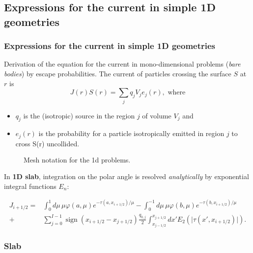 \documentclass[black]{slideCEA}
\DeclareMathOperator{\sign}{sign}
\begin{document}
\subsection{Expressions for the current in simple 1D geometries}

\begin{frame}
  \frametitle{Expressions for the current in simple 1D geometries}

  \vspace{-5mm}
  {Derivation of the equation for the current in mono-dimensional problems
  (\emph{bare bodies}) by \textcolor{ceared1}{escape probabilities}.
  The current of particles crossing the surface $S$ at $r$ is
  \[
    J(r) S(r) = \sum_j q_j V_j e_{j}(r), \text{ where}
  \] \vspace{-5mm}
  \begin{itemize}
    \item $q_j$ is the (isotropic) source in the region $j$ of volume $V_j$ and\\
    \item $e_j(r)$ is the probability for a particle isotropically emitted
          in region $j$ to cross S(r) uncollided.
  \end{itemize}
  }
  \begin{figure}[t]
    \centering
    \scalebox{1.5}{
      
    }
    \caption{Mesh notation for the 1d problems.}
  \end{figure}
  {
  In \textcolor{ceablue1}{\bf 1D slab}, integration on the polar angle is resolved \emph{analytically} by \textcolor{ceablue1}{exponential integral functions $E_n$}:

  \begin{equation*}
  \begin{split}
  J_{i+1/2} =& \int_0^1   {d\mu\, \mu \varphi(a, \mu) e^{-\tau(a, x_{i+1/2})/\mu}}
             - \int_0^{-1}{d\mu\, \mu \varphi(b, \mu) e^{-\tau(b, x_{i+1/2})/\mu}}\\
          +& \sum_{j=0}^{I-1} { \sign(x_{i+1/2} - x_{j+1/2}) \frac{q_{0,j}}{2} \int_{x_{j-1/2}}^{x_{j+1/2}}{dx'
          E_{2} \left(\lvert \tau(x', x_{i+1/2}) \rvert \right) } }.
  \end{split}
  \end{equation*}
  }
\end{frame}


\subsubsection{Slab}
\end{document}
